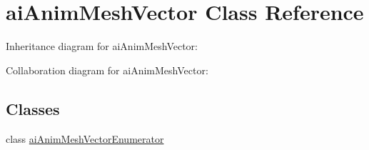 \hypertarget{classai_anim_mesh_vector}{\section{ai\+Anim\+Mesh\+Vector Class Reference}
\label{classai_anim_mesh_vector}
}


Inheritance diagram for ai\+Anim\+Mesh\+Vector\+:


Collaboration diagram for ai\+Anim\+Mesh\+Vector\+:
\subsection*{Classes}
\begin{DoxyCompactItemize}
\item 
class \hyperlink{classai_anim_mesh_vector_1_1ai_anim_mesh_vector_enumerator}{ai\+Anim\+Mesh\+Vector\+Enumerator}
\end{DoxyCompactItemize}
